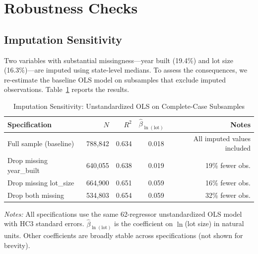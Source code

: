 %
\section{Robustness Checks}
\label{sec:robustness}

\subsection{Imputation Sensitivity}
\label{sec:imputation_sensitivity}

Two variables with substantial missingness---year built (19.4\%) and lot size (16.3\%)---are imputed using state-level medians. To assess the consequences, we re-estimate the baseline OLS model on subsamples that exclude imputed observations. Table~\ref{tab:imputation} reports the results.

\begin{table}[H]
\centering
\caption{Imputation Sensitivity: Unstandardized OLS on Complete-Case Subsamples}
\label{tab:imputation}
\begin{threeparttable}
\small
\begin{tabular}{lrrrr}
\toprule
Specification & $N$ & $R^2$ & $\hat{\beta}_{\ln(\text{lot})}$ & Notes \\
\midrule
Full sample (baseline) & 788,842 & 0.634 & 0.018 & All imputed values included \\
Drop missing year\_built & 640,055 & 0.638 & 0.019 & 19\% fewer obs. \\
Drop missing lot\_size & 664,900 & 0.651 & 0.059 & 16\% fewer obs. \\
Drop both missing & 534,803 & 0.654 & 0.059 & 32\% fewer obs. \\
\bottomrule
\end{tabular}
\begin{tablenotes}
\small
\item \textit{Notes:} All specifications use the same 62-regressor unstandardized OLS model with HC3 standard errors. $\hat{\beta}_{\ln(\text{lot})}$ is the coefficient on $\ln$(lot size) in natural units. Other coefficients are broadly stable across specifications (not shown for brevity).
\end{tablenotes}
\end{threeparttable}
\end{table}

